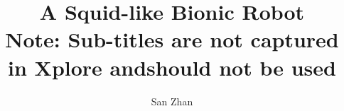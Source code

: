 
\setsansfont{Calibri}
\setmainfont{Calibri}

\graphicspath{{fig/}} %


\linespread{1.5} %

\setlength\columnsep{0.5cm} %



\renewcommand{\abstractnamefont}{\setmainfont{Times New Roman} \bfseries \slshape} %

\pagestyle{fancy}
\fancyhf{}

\fancyfoot[c]{\thepage\ \textbackslash \ \pageref{LastPage}} %

\renewcommand{\headrulewidth}{0mm} %

\title{A Squid-like Bionic Robot \\ {\footnotesize Note: Sub-titles are not captured in Xplore andshould not be used}}
\author{San Zhan} %
\date{} %


